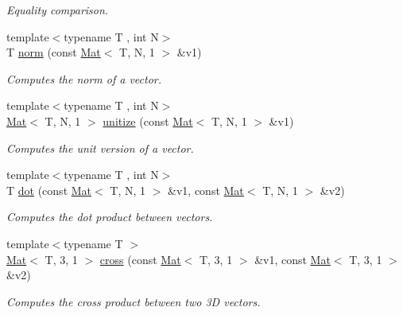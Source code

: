\begin{DoxyCompactItemize}
\begin{DoxyCompactList}\small\item\em Equality comparison. \end{DoxyCompactList}\item 
{\footnotesize template$<$typename T , int N$>$ }\\T \mbox{\hyperlink{namespacetao_ac35e732bcf5d8bfb7df27de9fc96ba08}{norm}} (const \mbox{\hyperlink{classtao_1_1_mat}{Mat}}$<$ T, N, 1 $>$ \&v1)
\begin{DoxyCompactList}\small\item\em Computes the norm of a vector. \end{DoxyCompactList}\item 
{\footnotesize template$<$typename T , int N$>$ }\\\mbox{\hyperlink{classtao_1_1_mat}{Mat}}$<$ T, N, 1 $>$ \mbox{\hyperlink{namespacetao_a413b369fdee9e7ff22a073ef73d2e302}{unitize}} (const \mbox{\hyperlink{classtao_1_1_mat}{Mat}}$<$ T, N, 1 $>$ \&v1)
\begin{DoxyCompactList}\small\item\em Computes the unit version of a vector. \end{DoxyCompactList}\item 
{\footnotesize template$<$typename T , int N$>$ }\\T \mbox{\hyperlink{namespacetao_a01d099eba731722c912f651d0956dc42}{dot}} (const \mbox{\hyperlink{classtao_1_1_mat}{Mat}}$<$ T, N, 1 $>$ \&v1, const \mbox{\hyperlink{classtao_1_1_mat}{Mat}}$<$ T, N, 1 $>$ \&v2)
\begin{DoxyCompactList}\small\item\em Computes the dot product between vectors. \end{DoxyCompactList}\item 
{\footnotesize template$<$typename T $>$ }\\\mbox{\hyperlink{classtao_1_1_mat}{Mat}}$<$ T, 3, 1 $>$ \mbox{\hyperlink{namespacetao_a0d5250c98322b01437ae6be0d9bd478d}{cross}} (const \mbox{\hyperlink{classtao_1_1_mat}{Mat}}$<$ T, 3, 1 $>$ \&v1, const \mbox{\hyperlink{classtao_1_1_mat}{Mat}}$<$ T, 3, 1 $>$ \&v2)
\begin{DoxyCompactList}\small\item\em Computes the cross product between two 3D vectors. \end{DoxyCompactList}\item 
\mbox{\label{namespacetao_a06d49c940f8c729117dafbcfaaea3cca}} 

\end{DoxyCompactItemize}
